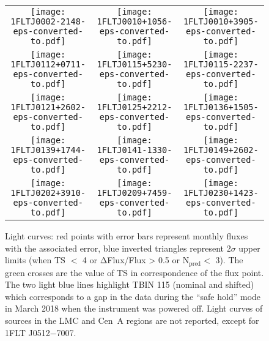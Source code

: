 \begin{figure}[!b]
  \centering
\setlength\tabcolsep{0.0pt}
\begin{tabular}{ccc}
  \texttt{[image: 1FLTJ0002-2148-eps-converted-to.pdf]}\label{fig:1FLTJ0002-2148}&
  \texttt{[image: 1FLTJ0010+1056-eps-converted-to.pdf]}\label{fig:1FLTJ0010+1056}&
  \texttt{[image: 1FLTJ0010+3905-eps-converted-to.pdf]}\label{fig:1FLTJ0010+3905}\\
  \texttt{[image: 1FLTJ0112+0711-eps-converted-to.pdf]}\label{fig:1FLTJ0112+0711}&
  \texttt{[image: 1FLTJ0115+5230-eps-converted-to.pdf]}\label{fig:1FLTJ0115+5230}&
  \texttt{[image: 1FLTJ0115-2237-eps-converted-to.pdf]}\label{fig:1FLTJ0115-2237}\\
  \texttt{[image: 1FLTJ0121+2602-eps-converted-to.pdf]}\label{fig:1FLTJ0121+2602}&
  \texttt{[image: 1FLTJ0125+2212-eps-converted-to.pdf]}\label{fig:1FLTJ0125+2212}&
  \texttt{[image: 1FLTJ0136+1505-eps-converted-to.pdf]}\label{fig:1FLTJ0136+1505}\\
  \texttt{[image: 1FLTJ0139+1744-eps-converted-to.pdf]}\label{fig:1FLTJ0139+1744}&
  \texttt{[image: 1FLTJ0141-1330-eps-converted-to.pdf]}\label{fig:1FLTJ0141-1330}&
  \texttt{[image: 1FLTJ0149+2602-eps-converted-to.pdf]}\label{fig:1FLTJ0149+2602}\\
  \texttt{[image: 1FLTJ0202+3910-eps-converted-to.pdf]}\label{fig:1FLTJ0202+3910}&
  \texttt{[image: 1FLTJ0209+7459-eps-converted-to.pdf]}\label{fig:1FLTJ0209+7459}&
  \texttt{[image: 1FLTJ0230+1423-eps-converted-to.pdf]}\label{fig:1FLTJ0230+1423}\\
\end{tabular}  
      \caption{%
   	 Light curves: red points with error bars represent monthly fluxes with the associated error, blue inverted triangles represent $2\sigma$ upper limits (when TS $<$ 4 or $\mathrm{\Delta}$Flux/Flux > 0.5 or N$\mathrm{_{pred}<}$ 3). The green crosses are the value of TS in correspondence of the flux point. The two light blue lines highlight TBIN 115 (nominal and shifted) which corresponds to a gap in the \fermilat data during the “safe hold” mode in March 2018 when the instrument was powered off. Light curves of sources in the LMC and Cen~A regions are not reported, except for 1FLT J0512$-$7007.}
\end{figure}\label{fig:lightccurve}
